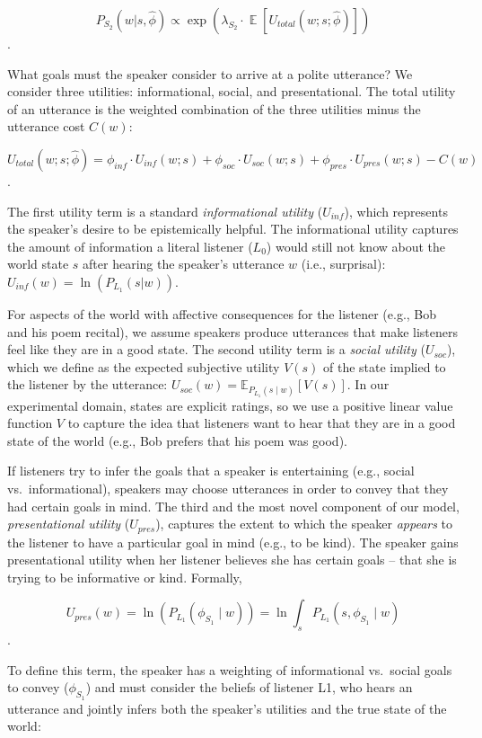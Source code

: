 \documentclass[floatsintext,mask,man]{apa6}
\theoremstyle{definition}
\theoremstyle{definition}
\theoremstyle{definition}
\theoremstyle{remark}
\begin{document}
\[P_{S_2}(w | s, \hat{\phi}) \propto \exp(\lambda_{S_2} \cdot \mathop{\mathbb{E}}[U_{total}(w; s; \hat{\phi})])\].

What goals must the speaker consider to arrive at a polite utterance? We
consider three utilities: informational, social, and presentational. The
total utility of an utterance is the weighted combination of the three
utilities minus the utterance cost \(C(w)\):

\[U_{total}(w; s; \hat{\phi}) = \phi_{inf} \cdot U_{inf}(w; s) + \phi_{soc} \cdot U_{soc}(w; s) + \phi_{pres} \cdot U_{pres}(w; s) - C(w)\].

The first utility term is a standard \emph{informational utility}
(\(U_{inf}\)), which represents the speaker's desire to be epistemically
helpful. The informational utility captures the amount of information a
literal listener (\(L_0\)) would still not know about the world state
\(s\) after hearing the speaker's utterance \(w\) (i.e., surprisal):
\(U_{inf}(w) = \ln(P_{L_1}(s | w))\).

For aspects of the world with affective consequences for the listener
(e.g., Bob and his poem recital), we assume speakers produce utterances
that make listeners feel like they are in a good state. The second
utility term is a \emph{social utility} (\(U_{soc}\)), which we define
as the expected subjective utility \(V(s)\) of the state implied to the
listener by the utterance:
\(U_{soc}(w) = \mathbb{E}_{P_{L_1}(s \mid w)}[V(s)]\). In our
experimental domain, states are explicit ratings, so we use a positive
linear value function \(V\) to capture the idea that listeners want to
hear that they are in a good state of the world (e.g., Bob prefers that
his poem was good).

If listeners try to infer the goals that a speaker is entertaining
(e.g., social vs.~informational), speakers may choose utterances in
order to convey that they had certain goals in mind. The third and the
most novel component of our model, \emph{presentational utility}
(\(U_{pres}\)), captures the extent to which the speaker \emph{appears}
to the listener to have a particular goal in mind (e.g., to be kind).
The speaker gains presentational utility when her listener believes she
has certain goals -- that she is trying to be informative or kind.
Formally,

\[U_{pres}(w) = \ln(P_{L_1}(\phi_{S_1} \mid w)) = \ln \int_s P_{L_1}(s, \phi_{S_1} \mid w)\].

To define this term, the speaker has a weighting of informational
vs.~social goals to convey (\(\phi_{S_1}\)) and must consider the
beliefs of listener L1, who hears an utterance and jointly infers both
the speaker's utilities and the true state of the world:
\end{document}
